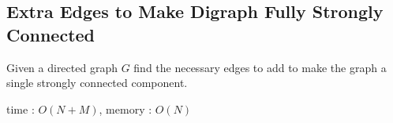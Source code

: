 \subsection{Extra Edges to Make Digraph Fully Strongly Connected}

Given a directed graph $G$ find the necessary edges to add to make the graph a single strongly connected component.

time : $O(N+M)$, memory : $O(N)$
